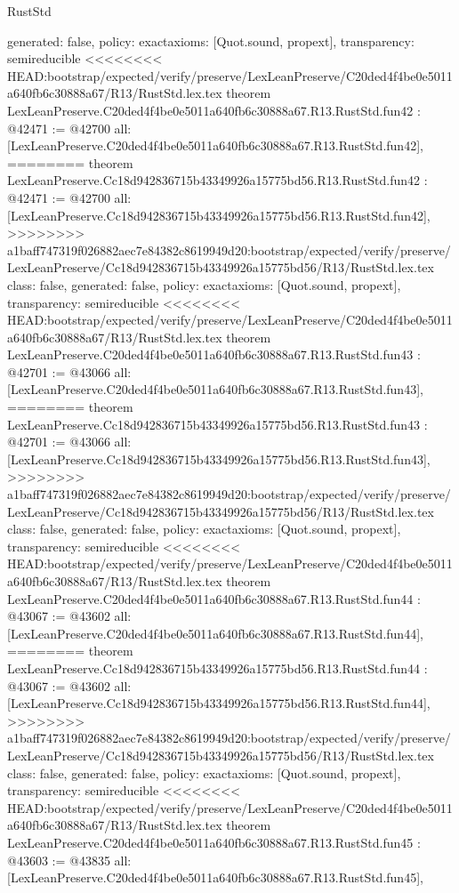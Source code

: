 \begin{lexlean}{RustStd}
\begin{coremodule}
{\begin{coremodule}
{{{{{{{{{{{{{{{{{{{{{{{{{{{{{{{{{{{{{{{{{{{{{  generated: false,
  policy: exact{axioms: [Quot.sound, propext]},
  transparency: semireducible
}
<<<<<<<< HEAD:bootstrap/expected/verify/preserve/LexLeanPreserve/C20ded4f4be0e5011a640fb6c30888a67/R13/RustStd.lex.tex
theorem LexLeanPreserve.C20ded4f4be0e5011a640fb6c30888a67.R13.RustStd.fun42 : @42471 := @42700 {
  all: [LexLeanPreserve.C20ded4f4be0e5011a640fb6c30888a67.R13.RustStd.fun42],
========
theorem LexLeanPreserve.Cc18d942836715b43349926a15775bd56.R13.RustStd.fun42 : @42471 := @42700 {
  all: [LexLeanPreserve.Cc18d942836715b43349926a15775bd56.R13.RustStd.fun42],
>>>>>>>> a1baff747319f026882aec7e84382c8619949d20:bootstrap/expected/verify/preserve/LexLeanPreserve/Cc18d942836715b43349926a15775bd56/R13/RustStd.lex.tex
  class: false,
  generated: false,
  policy: exact{axioms: [Quot.sound, propext]},
  transparency: semireducible
}
<<<<<<<< HEAD:bootstrap/expected/verify/preserve/LexLeanPreserve/C20ded4f4be0e5011a640fb6c30888a67/R13/RustStd.lex.tex
theorem LexLeanPreserve.C20ded4f4be0e5011a640fb6c30888a67.R13.RustStd.fun43 : @42701 := @43066 {
  all: [LexLeanPreserve.C20ded4f4be0e5011a640fb6c30888a67.R13.RustStd.fun43],
========
theorem LexLeanPreserve.Cc18d942836715b43349926a15775bd56.R13.RustStd.fun43 : @42701 := @43066 {
  all: [LexLeanPreserve.Cc18d942836715b43349926a15775bd56.R13.RustStd.fun43],
>>>>>>>> a1baff747319f026882aec7e84382c8619949d20:bootstrap/expected/verify/preserve/LexLeanPreserve/Cc18d942836715b43349926a15775bd56/R13/RustStd.lex.tex
  class: false,
  generated: false,
  policy: exact{axioms: [Quot.sound, propext]},
  transparency: semireducible
}
<<<<<<<< HEAD:bootstrap/expected/verify/preserve/LexLeanPreserve/C20ded4f4be0e5011a640fb6c30888a67/R13/RustStd.lex.tex
theorem LexLeanPreserve.C20ded4f4be0e5011a640fb6c30888a67.R13.RustStd.fun44 : @43067 := @43602 {
  all: [LexLeanPreserve.C20ded4f4be0e5011a640fb6c30888a67.R13.RustStd.fun44],
========
theorem LexLeanPreserve.Cc18d942836715b43349926a15775bd56.R13.RustStd.fun44 : @43067 := @43602 {
  all: [LexLeanPreserve.Cc18d942836715b43349926a15775bd56.R13.RustStd.fun44],
>>>>>>>> a1baff747319f026882aec7e84382c8619949d20:bootstrap/expected/verify/preserve/LexLeanPreserve/Cc18d942836715b43349926a15775bd56/R13/RustStd.lex.tex
  class: false,
  generated: false,
  policy: exact{axioms: [Quot.sound, propext]},
  transparency: semireducible
}
<<<<<<<< HEAD:bootstrap/expected/verify/preserve/LexLeanPreserve/C20ded4f4be0e5011a640fb6c30888a67/R13/RustStd.lex.tex
theorem LexLeanPreserve.C20ded4f4be0e5011a640fb6c30888a67.R13.RustStd.fun45 : @43603 := @43835 {
  all: [LexLeanPreserve.C20ded4f4be0e5011a640fb6c30888a67.R13.RustStd.fun45],
}}}}}}}}}}}}}}}}}}}}}}}}}}}}}}}}}}}}}}}}}}}}}}}}
\end{coremodule}}
\end{coremodule}
\end{lexlean}
